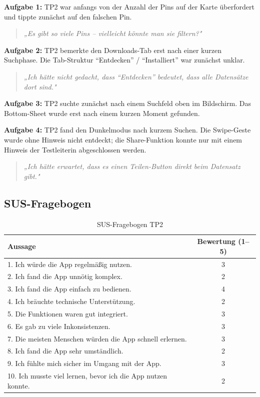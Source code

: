 \documentclass{article}
\begin{document}
\textbf{Aufgabe 1:} TP2 war anfangs von der Anzahl der Pins auf der Karte überfordert
und tippte zunächst auf den falschen Pin.
\begin{quote}
    \textit{„Es gibt so viele Pins – vielleicht könnte man sie filtern?"}
\end{quote}

\textbf{Aufgabe 2:} TP2 bemerkte den Downloads-Tab erst nach einer kurzen Suchphase.
Die Tab-Struktur \enquote{Entdecken} / \enquote{Installiert} war zunächst unklar.
\begin{quote}
    \textit{„Ich hätte nicht gedacht, dass \enquote{Entdecken} bedeutet,
    dass alle Datensätze dort sind."}
\end{quote}

\textbf{Aufgabe 3:} TP2 suchte zunächst nach einem Suchfeld oben im Bildschirm.
Das Bottom-Sheet wurde erst nach einem kurzen Moment gefunden.

\textbf{Aufgabe 4:} TP2 fand den Dunkelmodus nach kurzem Suchen.
Die Swipe-Geste wurde ohne Hinweis nicht entdeckt;
die Share-Funktion konnte nur mit einem Hinweis der Testleiterin abgeschlossen werden.
\begin{quote}
    \textit{„Ich hätte erwartet, dass es einen Teilen-Button direkt beim Datensatz gibt."}
\end{quote}

\subsection*{SUS-Fragebogen}

\begin{table}[H]
    \centering
    \begin{tabular}{|l|c|}
        \hline
        \textbf{Aussage} & \textbf{Bewertung (1–5)} \\
        \hline
        1. Ich würde die App regelmäßig nutzen. & 3 \\
        \hline
        2. Ich fand die App unnötig komplex. & 2 \\
        \hline
        3. Ich fand die App einfach zu bedienen. & 4 \\
        \hline
        4. Ich bräuchte technische Unterstützung. & 2 \\
        \hline
        5. Die Funktionen waren gut integriert. & 3 \\
        \hline
        6. Es gab zu viele Inkonsistenzen. & 3 \\
        \hline
        7. Die meisten Menschen würden die App schnell erlernen. & 3 \\
        \hline
        8. Ich fand die App sehr umständlich. & 2 \\
        \hline
        9. Ich fühlte mich sicher im Umgang mit der App. & 3 \\
        \hline
        10. Ich musste viel lernen, bevor ich die App nutzen konnte. & 2 \\
        \hline
    \end{tabular}
    \caption{SUS-Fragebogen TP2}
\end{table}
\end{document}
